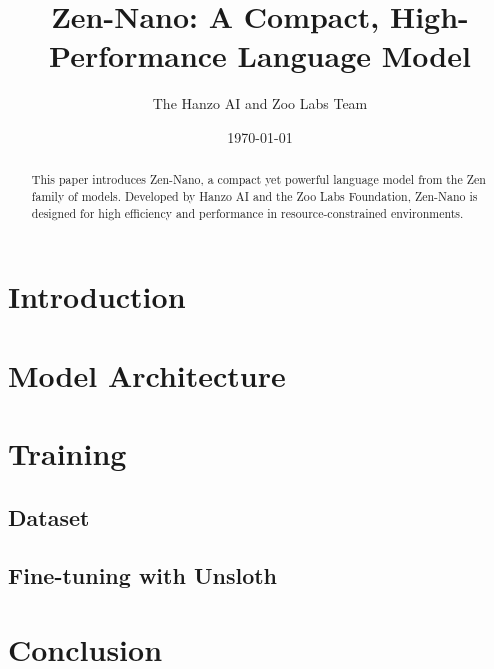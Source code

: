 \documentclass{article}
\title{Zen-Nano: A Compact, High-Performance Language Model}
\author{The Hanzo AI and Zoo Labs Team}
\date{\today}
\begin{document}
\maketitle

\begin{abstract}
    This paper introduces Zen-Nano, a compact yet powerful language model from the Zen family of models. Developed by Hanzo AI and the Zoo Labs Foundation, Zen-Nano is designed for high efficiency and performance in resource-constrained environments.
\end{abstract}

\section{Introduction}

\section{Model Architecture}

\section{Training}

\subsection{Dataset}

\subsection{Fine-tuning with Unsloth}

\section{Conclusion}
\end{document}
